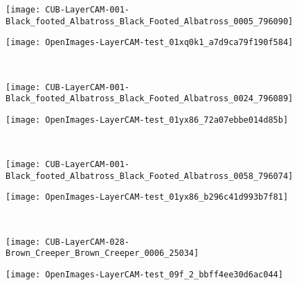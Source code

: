 \documentclass[twocolumn]{article}
\theoremstyle{definition}
\begin{document}
\begin{figure*}
     \centering
     \begin{subfigure}[b]{0.49\textwidth}
         \centering
         \texttt{[image: CUB-LayerCAM-001-Black\_footed\_Albatross\_Black\_Footed\_Albatross\_0005\_796090]}
     \end{subfigure}
     \hfill
     \begin{subfigure}[b]{0.49\textwidth}
         \centering
         \texttt{[image: OpenImages-LayerCAM-test\_01xq0k1\_a7d9ca79f190f584]}
     \end{subfigure}
     \\
     \vspace{0.1cm}
     \begin{subfigure}[b]{0.49\textwidth}
         \centering
         \texttt{[image: CUB-LayerCAM-001-Black\_footed\_Albatross\_Black\_Footed\_Albatross\_0024\_796089]}
     \end{subfigure}
     \hfill
     \begin{subfigure}[b]{0.49\textwidth}
         \centering
         \texttt{[image: OpenImages-LayerCAM-test\_01yx86\_72a07ebbe014d85b]}
     \end{subfigure}
     \\
     \vspace{0.1cm}
     \begin{subfigure}[b]{0.49\textwidth}
         \centering
         \texttt{[image: CUB-LayerCAM-001-Black\_footed\_Albatross\_Black\_Footed\_Albatross\_0058\_796074]}
     \end{subfigure}
     \hfill
     \begin{subfigure}[b]{0.49\textwidth}
         \centering
         \texttt{[image: OpenImages-LayerCAM-test\_01yx86\_b296c41d993b7f81]}
     \end{subfigure}
     \\
     \vspace{0.1cm}
     \begin{subfigure}[b]{0.49\textwidth}
         \centering
         \texttt{[image: CUB-LayerCAM-028-Brown\_Creeper\_Brown\_Creeper\_0006\_25034]}
     \end{subfigure}
     \hfill
     \begin{subfigure}[b]{0.49\textwidth}
         \centering
         \texttt{[image: OpenImages-LayerCAM-test\_09f\_2\_bbff4ee30d6ac044]}
     \end{subfigure}
     \\
     \vspace{0.1cm}

\end{figure*}
\end{document}
